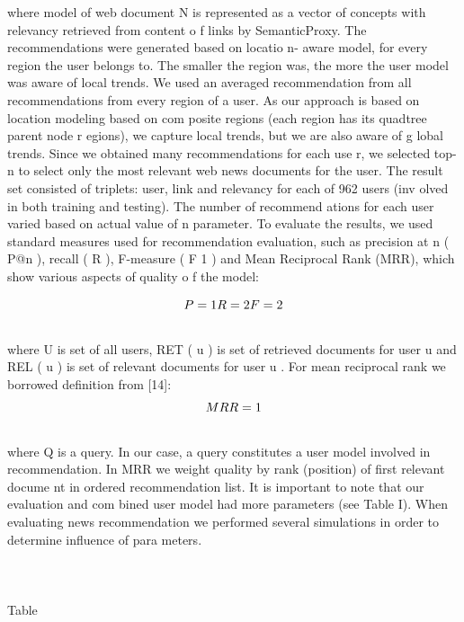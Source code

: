 \documentclass[conference]{IEEEtran}
\begin{document}
where  model  of  web  document 
N
  is  represented  as  a  vector 
of concepts with relevancy retrieved from content o
f links by 
SemanticProxy.  
The recommendations were generated based on locatio
n-
aware  model,  for  every  region  the  user  belongs  to. 
The 
smaller  the  region  was,  the  more  the  user  model  was
  aware 
of  local  trends.  We  used  an  averaged  recommendation
  from 
all  recommendations  from  every  region  of  a  user.  As
  our 
approach is based on  location  modeling based on  com
posite 
regions  (each  region  has  its  quadtree  parent  node  r
egions), 
we  capture  local  trends,  but  we  are  also  aware  of  g
lobal 
trends.  
Since we obtained many recommendations for each use
r, 
we selected top-n to select only the  most relevant 
web news 
documents  for  the  user.  The  result  set  consisted  of
  triplets: 
user,  link  and  relevancy  for  each  of  962  users  (inv
olved  in 
both  training  and  testing).  The  number  of  recommend
ations 
for each user varied based on actual value of 
n
 parameter.  
To  evaluate  the  results,  we  used  standard  measures 
used 
for   recommendation   evaluation,   such   as   precision   at
   n 
(
P@n
),  recall  (
R
),  F-measure  (
F
1
)  and  Mean  Reciprocal 
Rank  (MRR),  which  show  various  aspects  of  quality  o
f  the 
model:

\begin{equation}
P=1\\
R=2\\
F=2\\
\index{id6}
\end{equation}
\\
where 
U
  is  set  of  all  users, 
RET
(
u
)  is  set  of  retrieved 
documents   for   user 
u
   and 
REL
(
u
)
is   set   of   relevant 
documents for user 
u
. For mean reciprocal rank we borrowed 
definition from [14]: 
\begin{equation}
MRR=1
\index{id7}
\end{equation}
\\
where 
Q 
is  a  query.  In  our  case,  a  query  constitutes  a  user
model  involved  in  recommendation.  In 
MRR
  we  weight 
quality  by  rank  (position)  of  first  relevant  docume
nt  in 
ordered recommendation list. 
It  is  important  to  note  that  our  evaluation  and  com
bined 
user   model   had   more   parameters   (see   Table   I).   When 
evaluating   news   recommendation   we   performed   several
simulations in order to determine influence of para
meters.  \\
\\
\\
\\Table 
\\
\end{document}
